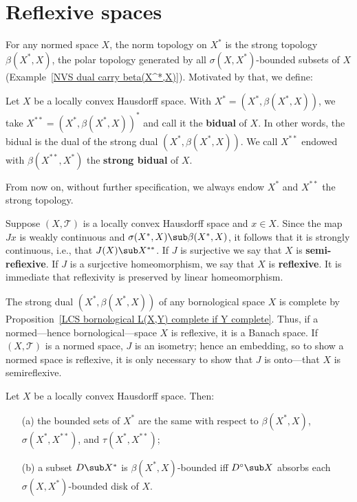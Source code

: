 \section{Reflexive spaces}
For any normed space $X$, the norm topology on $X^*$ is the strong topology $\beta(X^*,X)$, the polar topology generated by all $\sigma(X,X^*)$-bounded subsets of $X$ (Example~\ref{NVS dual carry beta(X^*,X)}). Motivated by that, we define:
\begin{definition}
Let $X$ be a locally convex Hausdorff space. With $X^*=(X^*,\beta(X^*,X))$, we take $X^{**}=(X^*,\beta(X^*,X))^*$ and call it the \textbf{bidual} of $X$. In other words, the bidual is the dual of the strong dual $(X^*,\beta(X^*,X))$. We call $X^{**}$ endowed with $\beta(X^{**},X^*)$ the \textbf{strong bidual} of $X$.
\end{definition}
From now on, without further specification, we always endow $X^*$ and $X^{**}$ the strong topology.\par
Suppose $(X,\mathcal{T})$ is a locally convex Hausdorff space and $x\in X$. Since the map $Jx$ is weakly continuous and $\sigma(X^*,X)\sub\beta(X^*,X)$, it follows that it is strongly continuous, i.e., that $J(X)\sub X^{**}$. If $J$ is surjective we say that $X$ is \textbf{semi-refiexive}. If $J$ is a surjcctive homeomorphism, we say that $X$ is \textbf{reflexive}. It is immediate that reflexivity is preserved by linear homeomorphism.
\begin{example}
The strong dual $(X^*,\beta(X^*,X))$ of any bornological space $X$ is complete by Proposition~\ref{LCS bornological L(X,Y) complete if Y complete}. Thus, if a normed---hence bornological---space $X$ is reflexive, it is a Banach space. If $(X,\mathcal{T})$ is a normed space, $J$ is an isometry; hence an embedding, so to show a normed space is reflexive, it is only necessary to show that $J$ is onto---that $X$ is semireflexive.
\end{example}
\begin{proposition}\label{LCHS bounded in X^*}
Let $X$ be a locally convex Hausdorff space. Then:
\begin{itemize}
\item[(a)] the bounded sets of $X^*$ are the same with respect to $\beta(X^*,X)$, $\sigma(X^*,X^{**})$, and $\tau(X^*,X^{**})$; 
\item[(b)] a subset $D\sub X^*$ is $\beta(X^*,X)$-bounded iff $D^\circ\sub X$ absorbs each $\sigma(X,X^*)$-bounded disk of $X$.
\end{itemize}
\end{proposition}
